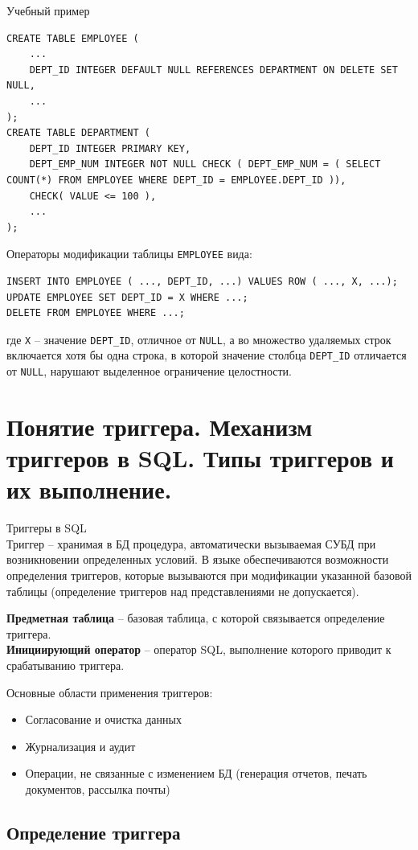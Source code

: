 \documentclass[a4paper,12pt]{article}
\begin{document}
Учебный пример
\begin{lstlisting}
CREATE TABLE EMPLOYEE (
    ...
    DEPT_ID INTEGER DEFAULT NULL REFERENCES DEPARTMENT ON DELETE SET NULL,
    ...
);
CREATE TABLE DEPARTMENT (
    DEPT_ID INTEGER PRIMARY KEY,
    DEPT_EMP_NUM INTEGER NOT NULL CHECK ( DEPT_EMP_NUM = ( SELECT COUNT(*) FROM EMPLOYEE WHERE DEPT_ID = EMPLOYEE.DEPT_ID )),
    CHECK( VALUE <= 100 ),
    ...
);
\end{lstlisting}

Операторы модификации таблицы \texttt{EMPLOYEE} вида:
\begin{lstlisting}
INSERT INTO EMPLOYEE ( ..., DEPT_ID, ...) VALUES ROW ( ..., X, ...);
UPDATE EMPLOYEE SET DEPT_ID = X WHERE ...;
DELETE FROM EMPLOYEE WHERE ...;
\end{lstlisting}

где \texttt{X} – значение \texttt{DEPT\_ID}, отличное от \texttt{NULL}, а во множество удаляемых строк включается хотя бы одна строка, в которой значение столбца \texttt{DEPT\_ID} отличается от \texttt{NULL}, нарушают выделенное ограничение целостности.

\section{Понятие триггера. Механизм триггеров в SQL. Типы триггеров и их выполнение.}

Триггеры в SQL\\
Триггер – хранимая в БД процедура, автоматически вызываемая СУБД при возникновении определенных условий. В языке обеспечиваются возможности определения триггеров, которые вызываются при модификации указанной базовой таблицы (определение триггеров над представлениями не допускается).

\textbf{Предметная таблица} – базовая таблица, с которой связывается определение триггера.\\
\textbf{Инициирующий оператор} – оператор SQL, выполнение которого приводит к срабатыванию триггера.

Основные области применения триггеров:
\begin{itemize}
    \item Согласование и очистка данных
    \item Журнализация и аудит
    \item Операции, не связанные с изменением БД (генерация отчетов, печать документов, рассылка почты)
\end{itemize}

\subsection{Определение триггера}
\end{document}
